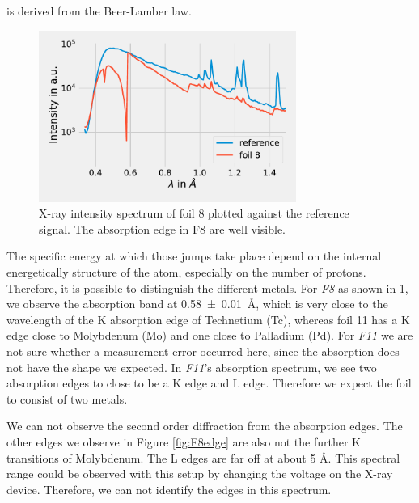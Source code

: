 is derived from the Beer-Lamber law.
\begin{figure}[ht]
    \centering
    \includegraphics[width = 0.75\textwidth]{Programming/Absorption/absorptionskanteFit.pdf}
    \caption[short]{X-ray intensity spectrum  of foil 8 plotted against the reference signal. The absorption edge in F8 are well visible.}
    \label{fig:IntF8ref}
\end{figure}
The specific energy at which those jumps take place depend on the internal energetically structure of 
the atom, especially on the number of protons. Therefore, it is possible to distinguish the different metals. For \textit{F8} as shown in \ref{fig:IntF8ref}, we observe the absorption band at 
\SI{0.58\pm0.01}{ \angstrom}, which is very close to the wavelength of the K absorption edge of Technetium (Tc), whereas foil 11 has a K edge close to Molybdenum (Mo) and one close to Palladium (Pd). For \textit{F11} we are not sure whether a
measurement error occurred here, since the absorption does not have the shape we expected. In \textit{F11}'s absorption spectrum, we see two absorption edges to close to be a K edge and L edge. Therefore we expect the foil to consist of two metals.

We can not observe the second order diffraction from the absorption edges. The other edges we observe in Figure \ref{fig:F8edge} are also not the further K transitions of Molybdenum. The L edges are far off at about 5 \AA. This spectral range could be observed with this setup by changing the voltage on the X-ray device. Therefore, we can not identify the edges in this spectrum. 

